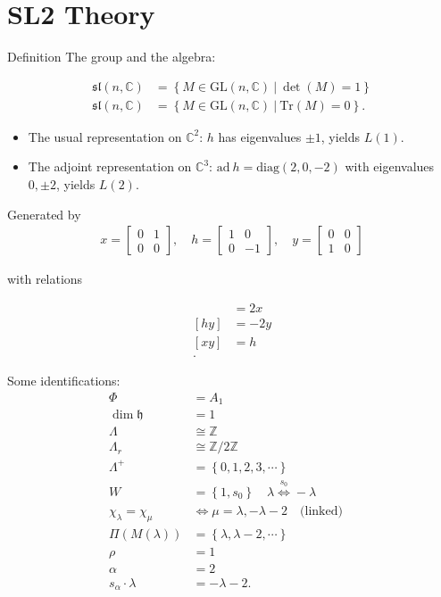 \documentclass[11pt]{scrartcl}
\theoremstyle{definition}
\theoremstyle{theorem}
\theoremstyle{proof}
\theoremstyle{definition}
\theoremstyle{break}
\theoremstyle{problem}
\providecommand{\tightlist}{%
  \setlength{\itemsep}{0pt}\setlength{\parskip}{0pt}}
\newcommand{\CC}[0]{{\mathbb{C}}}
\newcommand{\ZZ}[0]{{\mathbb{Z}}}
\newcommand{\gl}[0]{\mathrm{GL}}
\newcommand{\ad}[0]{\mathrm{ad}~}
\newcommand{\qtext}[1]{{\quad \text{#1} \quad}}
\newcommand{\lieh}[0]{{\mathfrak{h}}}
\newcommand{\liesl}[0]{{\mathfrak{sl}}}
\newcommand{\suchthat}[0]{{~\mathrel{\Big|}~}}
\newcommand{\theset}[1]{\left\{{#1}\right\}}
\newcommand{\tr}[0]{\mathrm{Tr}}
\begin{document}
\hypertarget{sl2-theory}{%
\section{SL2 Theory}\label{sl2-theory}}

Definition The group and the algebra:

\begin{align*}
\liesl(n, \CC)     &= \theset{M \in \gl(n, \CC) \suchthat \det(M) = 1} \\
\liesl(n, \CC)  &= \theset{M \in \gl(n, \CC) \suchthat \tr(M) = 0}
.\end{align*}

\begin{itemize}
\tightlist
\item
  The usual representation on \(\CC^2\): \(h\) has eigenvalues
  \(\pm 1\), yields \(L(1)\).
\item
  The adjoint representation on \(\CC^3\):
  \(\ad h = \mathrm{diag}(2, 0, -2)\) with eigenvalues \(0, \pm 2\),
  yields \(L(2)\).
\end{itemize}

Generated by \begin{align*}
x =
\begin{bmatrix}
0 & 1 \\
0 & 0
\end{bmatrix}
,\quad
h =
\begin{bmatrix}
1 & 0 \\
0 & -1
\end{bmatrix}
,\quad
y =
\begin{bmatrix}
0 & 0 \\
1 & 0
\end{bmatrix}
\end{align*}

with relations

\begin{align*}
[hx] &= 2x \\
[hy] &= -2y \\
[xy] &= h \\
.\end{align*}

Some identifications: \begin{align*}
\Phi &= A_1 \\
\dim \lieh &= 1\\
\Lambda &\cong \ZZ \\
\Lambda_r & \cong \ZZ/2\ZZ \\
\Lambda^+ &= \theset{0, 1, 2, 3, \cdots} \\
W &= \theset{1, s_0} \quad \lambda \overset{s_0}\iff -\lambda \\
\chi_\lambda = \chi_\mu &\iff \mu = \lambda, -\lambda-2 \qtext{(linked)}\\
\Pi(M(\lambda)) &= \theset{\lambda, \lambda-2, \cdots} \\
\rho &= 1 \\
\alpha &= 2 \\
s_\alpha \cdot \lambda &= - \lambda - 2
.\end{align*}
\end{document}
